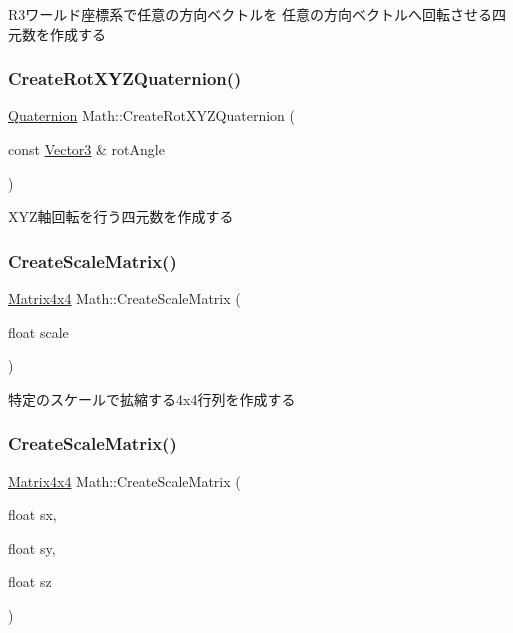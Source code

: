 R3ワールド座標系で任意の方向ベクトルを 任意の方向ベクトルへ回転させる四元数を作成する \mbox{\label{namespace_math_a50fabf83a1d5a726f448e8085c6ce06f}} 
\subsubsection{\texorpdfstring{Create\+Rot\+X\+Y\+Z\+Quaternion()}{CreateRotXYZQuaternion()}}
{\footnotesize\ttfamily \mbox{\hyperlink{struct_math_1_1_quaternion}{Quaternion}} Math\+::\+Create\+Rot\+X\+Y\+Z\+Quaternion (\begin{DoxyParamCaption}\item[{const \mbox{\hyperlink{struct_math_1_1_vector3}{Vector3}} \&}]{rot\+Angle }\end{DoxyParamCaption})}



X\+Y\+Z軸回転を行う四元数を作成する 

\mbox{\label{namespace_math_a70c81aec69f6a6b6e586a0d0f5d2ae71}} 
\subsubsection{\texorpdfstring{Create\+Scale\+Matrix()}{CreateScaleMatrix()}\hspace{0.1cm}{\footnotesize\ttfamily [1/3]}}
{\footnotesize\ttfamily \mbox{\hyperlink{struct_math_1_1_matrix4x4}{Matrix4x4}} Math\+::\+Create\+Scale\+Matrix (\begin{DoxyParamCaption}\item[{float}]{scale }\end{DoxyParamCaption})}



特定のスケールで拡縮する4x4行列を作成する 

\mbox{\label{namespace_math_af37fd756ce6f0ed92743c168b170b695}} 
\subsubsection{\texorpdfstring{Create\+Scale\+Matrix()}{CreateScaleMatrix()}\hspace{0.1cm}{\footnotesize\ttfamily [2/3]}}
{\footnotesize\ttfamily \mbox{\hyperlink{struct_math_1_1_matrix4x4}{Matrix4x4}} Math\+::\+Create\+Scale\+Matrix (\begin{DoxyParamCaption}\item[{float}]{sx,  }\item[{float}]{sy,  }\item[{float}]{sz }\end{DoxyParamCaption})}

